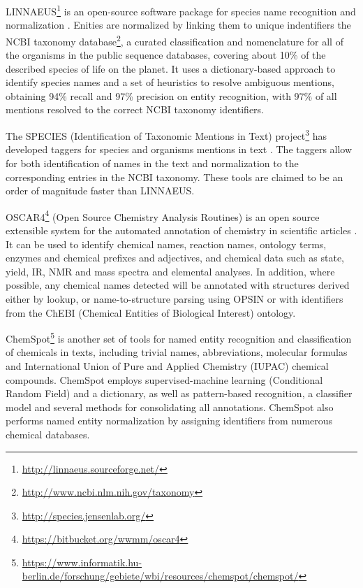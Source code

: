 \documentclass[11pt,oneside,a4paper]{report}
\begin{document}
LINNAEUS\footnote{\url{http://linnaeus.sourceforge.net/}} is an open-source software package for species name recognition and normalization \citep{Gerner2010LINNAEUS}. 
Enities are normalized by linking them to unique indentifiers the NCBI taxonomy database\footnote{\url{http://www.ncbi.nlm.nih.gov/taxonomy}}, a curated classification and nomenclature for all of the organisms in the public sequence databases, covering about 10\% of the described species of life on the planet.
It uses a dictionary-based approach to identify species names and a set of heuristics to resolve ambiguous mentions, obtaining 94\% recall and 97\% precision on entity recognition, with 97\% of all mentions resolved to the correct NCBI taxonomy identifiers.
 
The SPECIES (Identification of Taxonomic Mentions in Text) project\footnote{\url{http://species.jensenlab.org/}} has developed taggers for species and organisms mentions in text \citep{Pafilis2013SPECIES}. 
The taggers allow for both identification of names in the text and normalization to the corresponding entries in the NCBI taxonomy.
These tools are claimed to be an order of magnitude faster than LINNAEUS.

OSCAR4\footnote{\url{https://bitbucket.org/wwmm/oscar4}} (Open Source Chemistry Analysis Routines) is an open source extensible system for the automated annotation of chemistry in scientific articles \citep{Jessop2011OSCAR4}.
It can be used to identify chemical names, reaction names, ontology terms, enzymes and chemical prefixes and adjectives, and chemical data such as state, yield, IR, NMR and mass spectra and elemental analyses. 
In addition, where possible, any chemical names detected will be annotated with structures derived either by lookup, or name-to-structure parsing using OPSIN or with identifiers from the ChEBI (Chemical Entities of Biological Interest) ontology.

ChemSpot\footnote{\url{https://www.informatik.hu-berlin.de/forschung/gebiete/wbi/resources/chemspot/chemspot/}} is another set of tools for named entity recognition and classification of chemicals in texts, including trivial names, abbreviations, molecular formulas and International Union of Pure and Applied Chemistry (IUPAC) chemical compounds. 
ChemSpot employs supervised-machine learning (Conditional Random Field) and a dictionary, as well as pattern-based recognition, a classifier model and several methods for consolidating all annotations. 
ChemSpot also performs named entity normalization by assigning identifiers from numerous chemical databases. 
\end{document}
